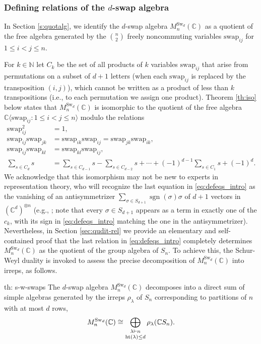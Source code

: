 \documentclass[12pt,dvipsnames,accepted=2016-08-18,a4paper,onecolumn]{quantumarticle}
\DeclareMathOperator{\het}{ht}
\newcommand{\CR}[1]{{\color{red} #1}}
\numberwithin{equation}{section}
\newcommand{\N}{\mathbb N}
\newcommand{\CC}{\mathbb C}
\theoremstyle{definition}
\begin{document}
\subsubsection{Defining relations of the $d$-swap algebra}

In Section \ref{s:quotalg}, we identify the $d$-swap algebra $M^{\text{Sw}_d}_n(\mathbb{C})$ as a quotient of the free algebra generated by the $\binom{n}{2}$ freely noncommuting variables $\text{swap}_{ij}$ for $1\le i<j\le n$.


For $k\in\N$  let $C_k$ be the set of all products of $k$ variables $\text{swap}_{ij}$  that arise from permutations on a subset of $d+1$ letters (when each $\text{swap}_{ij}$ is replaced by the transposition $(i,j)$), which cannot be written as a product of less than $k$ transpositions (i.e., to each permutation we assign one product). 
Theorem \ref{th:iso} below states that $M^{\text{Sw}_d}_n(\mathbb{C})$ is isomorphic to 
the quotient of the free algebra
$\CC\langle\text{swap}_{ij}\colon 1\le i<j\le n\rangle$ modulo the relations
\begin{equation}\label{eq:defeqs_intro}
\begin{split}
\text{swap}_{ij}^2 &= 1,\\
\text{swap}_{ij}\text{swap}_{jk} &= \text{swap}_{ik}\text{swap}_{ij} = \text{swap}_{jk}\text{swap}_{ik},\\
\text{swap}_{ij}\text{swap}_{kl} &= \text{swap}_{kl}\text{swap}_{ij},\\
\sum_{s\in C_d}s
&{{}
=\sum_{s\in C_{d-1}}s
-\sum_{s\in C_{d-2}}s
+\cdots+(-1)^{d-1}
\sum_{s\in C_{1}}s
+(-1)^d.
}
\end{split}
\end{equation}
We acknowledge that this isomorphism may not be new to experts in representation theory, who will recognize the last equation in \eqref{eq:defeqs_intro} as the vanishing of 
an antisymmetrizer $\sum_{\sigma\in S_{d+1}}\operatorname{sgn}(\sigma)\sigma$ of $d+1$ vectors in $(\CC^d)^{\otimes n}$ 
(e.g., \cite[Section 11.6]{Probook}; note that every $\sigma\in S_{d+1}$ appears as a term in exactly one of the $c_k$, with its sign in \eqref{eq:defeqs_intro} matching the one in the antisymmetrizer). 
Nevertheless, in Section \ref{sec:qudit-rel} we provide an elementary and self-contained proof that the last relation in \eqref{eq:defeqs_intro} completely determines $M^{\text{Sw}_d}_n(\mathbb{C})$ as the quotient of the group algebra of $S_n$. To achieve this, the Schur-Weyl duality is invoked to assess the precise decomposition of $M^{\text{Sw}_d}_n(\mathbb{C})$ into irreps, as follows.
\begin{repthm}{th: s-w-swaps}
	The $d$-swap algebra $M^{\text{Sw}_d}_n(\mathbb{C})$ decomposes into a direct sum of simple algebras generated by the irreps $\rho_\lambda$ of $S_n$ corresponding to partitions of $n$ with at most $d$ rows,
	$$
	M^{\text{\textnormal{Sw}}_d}_n(\mathbb{C}) \cong \bigoplus_{\substack{\lambda\vdash n \\[.5mm] \het(\lambda)\le d}} \rho_{\lambda} (\mathbb{C}S_n).
	$$
\end{repthm}
\end{document}
